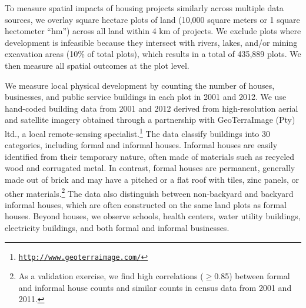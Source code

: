 \documentclass[12pt]{article}
\begin{document}


To measure spatial impacts of housing projects similarly across multiple data sources, we overlay square hectare plots of land (10,000 square meters or 1 square hectometer ``hm'') across all land within 4 km of projects.  We exclude plots where development is infeasible because they intersect with rivers, lakes, and/or mining excavation areas (10\% of total plots), which results in a total of 435,889 plots.  We then measure all spatial outcomes at the plot level.

We measure local physical development by counting the number of houses, businesses, and public service buildings in each plot in 2001 and 2012.  We use hand-coded building data from 2001 and 2012 derived from high-resolution aerial and satellite imagery obtained through a partnership with GeoTerraImage (Pty) ltd., a local remote-sensing specialist.\footnote{\href{http://www.geoterraimage.com/}{\tt http://www.geoterraimage.com/}} The data classify buildings into 30 categories, including formal and informal houses. Informal houses are easily identified from their temporary nature, often made of materials such as recycled wood and corrugated metal. In contrast, formal houses are permanent, generally made out of brick and may have a pitched or a flat roof with tiles, zinc panels, or other materials.\footnote{As a validation exercise, we find high correlations ($\geq$0.85) between formal and informal house counts and similar counts in census data from 2001 and 2011.}  The data also distinguish between non-backyard and backyard informal houses, which are often constructed on the same land plots as formal houses.  Beyond houses, we observe schools, health centers, water utility buildings, electricity buildings, and both formal and informal businesses.  


\end{document}
